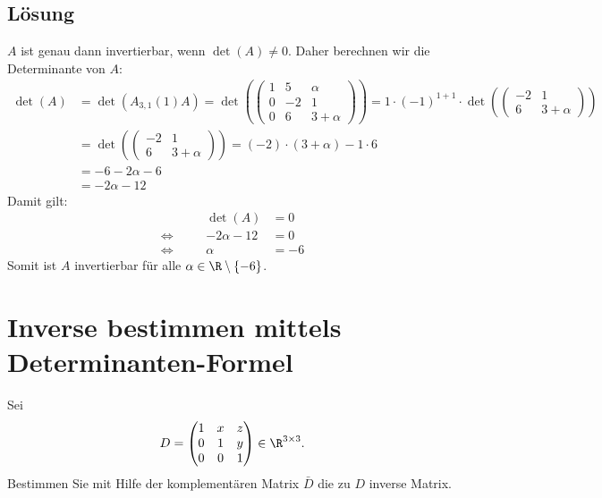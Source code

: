 \subsection*{L\"osung}
$A$ ist genau dann invertierbar, wenn $\det(A)\ne 0$. Daher berechnen wir die Determinante von $A$:
\begin{align*}
\det(A)&=\det(A_{3,1}(1)A)=\det(\begin{pmatrix}
		1	&5	&\alpha	\\
		0	&-2	&1	\\
		0	&6	&3+\alpha
	\end{pmatrix})=1\cdot(-1)^{1+1}\cdot\det(\begin{pmatrix}
		-2	&1	\\
		6	&3+\alpha
	\end{pmatrix})\\
	&=\det(\begin{pmatrix}
		-2	&1	\\
		6	&3+\alpha
	\end{pmatrix})=(-2)\cdot(3+\alpha)-1\cdot 6\\
	&=-6-2\alpha-6\\
	&=-2\alpha-12
\end{align*}
Damit gilt:
\begin{align*}
&&\det(A)&=0\\
\Leftrightarrow\quad&& -2\alpha-12&=0\\
\Leftrightarrow\quad&& \alpha&=-6
\end{align*}
Somit ist $A$ invertierbar für alle $\alpha \in \R\setminus\{-6\}$.

\newpage
\section{Inverse bestimmen mittels Determinanten-Formel}

Sei 
$$
	D = 
	\begin{pmatrix}
		1	& x	&z\\
		0	&1&y\\		
		0	&0	&1
	\end{pmatrix}
	\in \R^{3\times 3}.
$$
Bestimmen Sie mit Hilfe der komplementären Matrix $\bar D$ die zu $D$ inverse Matrix.
